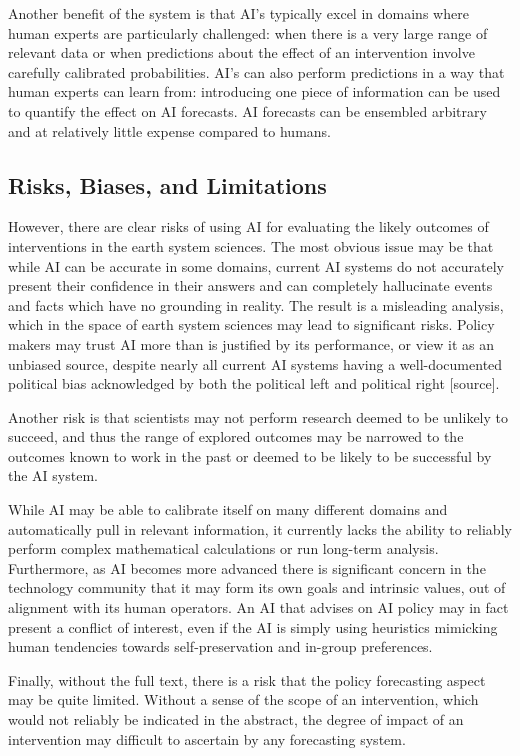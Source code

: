 \documentclass[12pt,a4paper]{article}
\begin{document}
Another benefit of the system is that AI's typically excel in domains where human experts are particularly challenged: when there is a very large range of relevant data or when predictions about the effect of an intervention involve carefully calibrated probabilities. AI's can also perform predictions in a way that human experts can learn from: introducing one piece of information can be used to quantify the effect on AI forecasts. AI forecasts can be ensembled arbitrary and at relatively little expense compared to humans. 

\subsection{Risks, Biases, and Limitations}
However, there are clear risks of using AI for evaluating the likely outcomes of interventions in the earth system sciences. The most obvious issue may be that while AI can be accurate in some domains, current AI systems do not accurately present their confidence in their answers and can completely hallucinate events and facts which have no grounding in reality. The result is a misleading analysis, which in the space of earth system sciences may lead to significant risks. Policy makers may trust AI more than is justified by its performance, or view it as an unbiased source, despite nearly all current AI systems having a well-documented political bias acknowledged by both the political left and political right [source]. 

Another risk is that scientists may not perform research deemed to be unlikely to succeed, and thus the range of explored outcomes may be narrowed to the outcomes known to work in the past or deemed to be likely to be successful by the AI system. 

While AI may be able to calibrate itself on many different domains and automatically pull in relevant information, it currently lacks the ability to reliably perform complex mathematical calculations or run long-term analysis. Furthermore, as AI becomes more advanced there is significant concern in the technology community that it may form its own goals and intrinsic values, out of alignment with its human operators. An AI that advises on AI policy may in fact present a conflict of interest, even if the AI is simply using heuristics mimicking human tendencies towards self-preservation and in-group preferences. 

Finally, without the full text, there is a risk that the policy forecasting aspect may be quite limited. Without a sense of the scope of an intervention, which would not reliably be indicated in the abstract, the degree of impact of an intervention may difficult to ascertain by any forecasting system.
\end{document}

